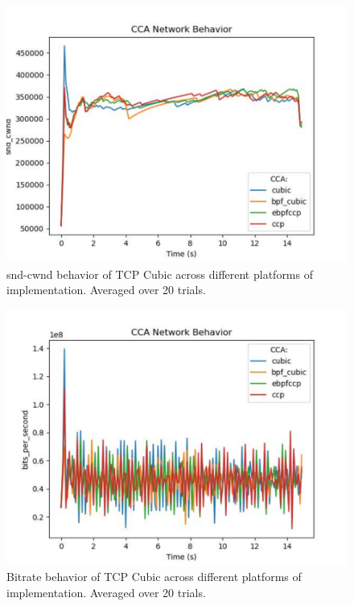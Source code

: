 \documentclass[../main.tex]{subfiles}
\begin{document}
\begin{figure}[t]
    \centering
        \includegraphics[width=\columnwidth]{img/cca-behavior-cwnd}
        \caption{snd-cwnd behavior of TCP Cubic across different platforms of implementation. Averaged over 20 trials.
        }\label{fig:cca-behavior-cwnd}
    \end{figure}

\begin{figure}[t]
    \centering
        \includegraphics[width=\columnwidth]{img/cca-behavior-bitrate}
        \caption{Bitrate behavior of TCP Cubic across different platforms of implementation. Averaged over 20 trials.
        }\label{fig:cca-behavior-bitrate}
    \end{figure}
\end{document}
